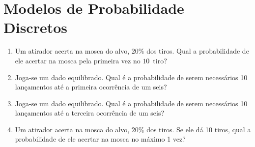 \thispagestyle{cap2}
\section*{Modelos de Probabilidade Discretos}

\begin{enumerate}
\item Um atirador acerta na mosca do alvo, $20\%$ dos tiros. Qual a probabilidade de ele acertar na mosca pela primeira vez no $10$\textordmasculine\ tiro?


\item Joga-se um dado equilibrado. Qual é a probabilidade de serem necessários 10 lançamentos até a primeira ocorrência de um seis?


\item Joga-se um dado equilibrado. Qual é a probabilidade de serem necessários 10 lançamentos até a terceira ocorrência de um seis?
	
\item Um atirador acerta na mosca do alvo, $20\%$ dos tiros. Se ele dá 10 tiros, qual a probabilidade de ele acertar na mosca no máximo 1 vez?


\end{enumerate}
